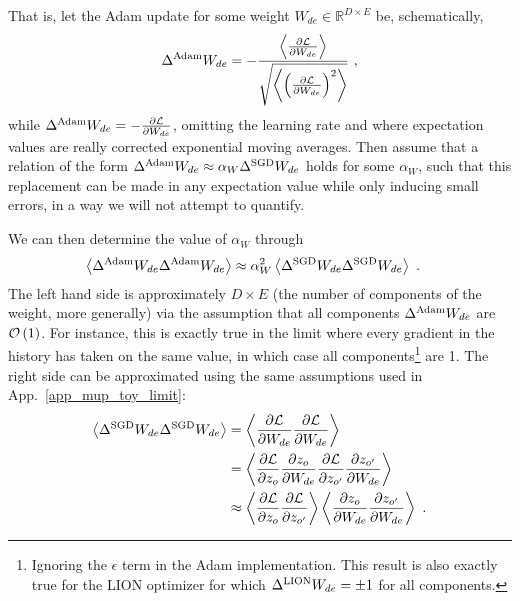 That is, let the Adam update for some weight $ W_{ de }\in \mathbb{R}^{ D\times E } $ be, schematically,
 \begin{align}
 \Delta^{ {\rm Adam} }    W_{ de }  =- \frac{ \left\langle \frac{ \partial \mathcal{L} }{ \partial W_{ de } } \right\rangle }{ \sqrt{ \left\langle \left (\frac{ \partial \mathcal{L} }{ \partial W_{ de } }\right )^{ 2 } \right\rangle } } \ ,
 \end{align}
 while  $ \Delta^{ {\rm Adam} }    W_{ de } =- \frac{ \partial \mathcal{L} }{ \partial W_{ de } } $,
 omitting the learning rate and where expectation values are really corrected exponential moving
 averages.  Then assume that a relation of the form $ \Delta^{ {\rm Adam} }    W_{ de }\approx
 \alpha_{ W } \Delta^{ {\rm SGD} }    W_{ de } $ holds for some $ \alpha_{ W } $, such that this
 replacement can be made in any expectation value while only inducing small errors, in a way we will
 not attempt to quantify.

 We can then determine the value of $ \alpha_{ W } $ through
 \begin{align}
     \left\langle \Delta^{ {\rm Adam} }    W_{ de }\Delta^{ {\rm Adam} }    W_{ de } \right\rangle
     &\approx \alpha_{ W }^{ 2 } \left\langle \Delta^{ {\rm SGD} }    W_{ de }\Delta^{ {\rm SGD} }    W_{ de } \right\rangle \ .
 \end{align}
The left hand side is approximately $ D\times E $ (the number of components of the weight, more
generally) via the assumption that all components $ \Delta^{ {\rm Adam} }    W_{ de } $ are $ \mathcal{O}
\left( 1 \right)  $. For instance, this is exactly true in the limit where every gradient in the
history has taken on the same value, in which case all components\footnote{Ignoring the $ \epsilon $
term in the Adam implementation. This result is also exactly true for the LION optimizer
\cite{chen2023symbolicdiscoveryoptimizationalgorithms} for which $ \Delta^{ {\rm LION} }    W_{ de }
=\pm 1 $ for all components.} are 1. The right side can be approximated using the same assumptions
used in App.~\ref{app_mup_toy_limit}:
\begin{align}
    \left\langle \Delta^{ {\rm SGD} }    W_{ de }\Delta^{ {\rm SGD} }    W_{ de } \right\rangle      &= \left\langle \frac{ \partial \mathcal{L} }{ \partial W_{ de } }\frac{ \partial \mathcal{L} }{ \partial W_{ de } } \right\rangle\nonumber\\
         &=\left\langle \frac{ \partial \mathcal{L} }{ \partial z_{ o } }\frac{ \partial z_{ o } }{ \partial W_{ de } }\frac{\partial \mathcal{L} }{ \partial z_{ o' } }\frac{ \partial z_{ o' } }{ \partial W_{ de } } \right\rangle\nonumber\\
         &\approx \left\langle \frac{ \partial \mathcal{L} }{ \partial z_{ o } }\frac{\partial \mathcal{L} }{ \partial z_{ o' } }\right\rangle \left \langle  \frac{ \partial z_{ o } }{ \partial W_{ de } }\frac{ \partial z_{ o' } }{ \partial W_{ de } } \right\rangle \ .
\end{align}

